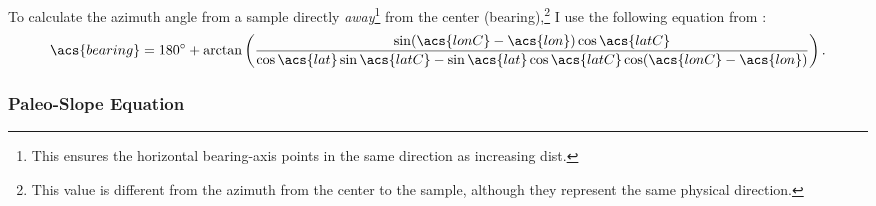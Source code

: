 To calculate the azimuth angle from a sample directly \emph{away}\footnote{This ensures the horizontal \acs{bearing}-axis points in the same direction as increasing \acs{dist}.} from the center (\acs{bearing}),\footnote{This value is different from the azimuth from the center to the sample, although they represent the same physical direction.} I use the following equation from \textcite{williams_aviation, veness_calculate}:
\begin{equation}
    \acs{bearing} = \ang{180} + \arctan\left(\frac{\sin(\acs{lonC}-\acs{lon})\cos\acs{latC}} {\cos\acs{lat} \sin\acs{latC}-\sin\acs{lat}\cos\acs{latC}\cos(\acs{lonC}-\acs{lon})}\right).\label{eq:bearing}
\end{equation} 

\subsubsection{Paleo-Slope Equation}

